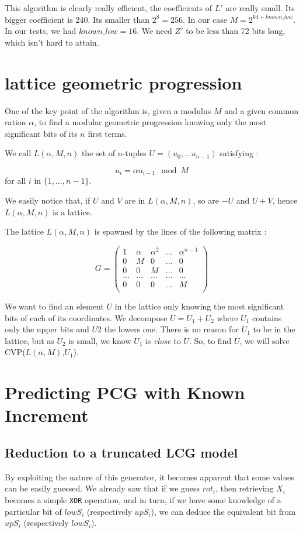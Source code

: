 \documentclass[preprint]{iacrtrans}
\begin{document}
This algorithm is clearly really efficient, the coefficients of $L'$ are really small. Its bigger coefficient is $240$. Its smaller than $2^8 = 256$. In our case $M = 2^{64 + known\_low}$. In our tests, we had $known\_low = 16$. We need $Z'$ to be less than 72 bits long, which isn't hard to attain.

\section{lattice geometric progression}

One of the key point of the algorithm is, given a modulus \(M\) and a given common ration \(\alpha\), to find a modular geometric progression knowing only the most significant bits of its \(n\) first terms.

We call \(L(\alpha,M,n)\) the set of n-tuples \(U = (u_0,\dots u_{n-1})\) satisfying :

\[u_{i} = \alpha u_{i-1} \mod M \] for all \(i\) in \(\{1,\dots,n-1\}\).


We easily notice that, if \(U\) and \(V\) are in \(L(\alpha,M,n)\), so are \(-U\) and \(U+V\), hence \(L(\alpha,M,n)\) is a lattice.

The lattice \(L(\alpha,M,n)\) is spawned by the lines of the following matrix :

\[G =\begin{pmatrix}
1&\alpha&\alpha^2&\dots&\alpha^{n-1}\\
0&M&0&\dots&0\\
0&0&M&\dots&0\\
\dots&\dots&\dots&\dots&\dots\\
0&0&0&\dots&M\\
\end{pmatrix}\]

We want to find an element \(U\) in the lattice only knowing the most significant bits of each of its coordinates. We decompose \(U = U_1 + U_2\) where \(U_1\) contains only the upper bits and \(U2\) the lowers one. There is no reason for \(U_1\) to be in the lattice, but as \(U_2\) is small, we know \(U_1\) is \emph{close} to \(U\). So, to find \(U\), we will solve CVP(\(L(\alpha,M)\),\(U_1\)).

\section{Predicting PCG with Known Increment}
\subsection{Reduction to a truncated LCG model}
By exploiting the nature of this generator, it becomes apparent that some values can be easily guessed. We already saw that if we guess $rot_i$, then retrieving $X_i$ becomes a simple \texttt{XOR} operation, and in turn, if we have some knowledge of a particular bit of $lowS_i$ (respectively $upS_i$), we can deduce the equivalent bit from $upS_i$ (respectively $lowS_i$).\\
\end{document}
